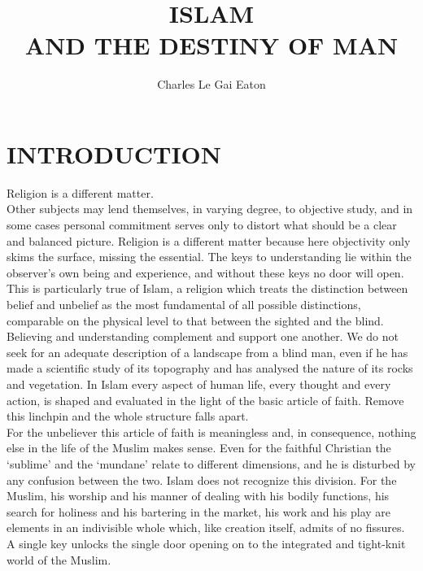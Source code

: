 \documentclass[10pt, twoside,openright]{book}
\title{\Huge \textbf{\textsc{ISLAM}\\ \Large AND THE DESTINY OF MAN}}
\author{\large Charles Le Gai Eaton}
\date{ }
\begin{document}


\maketitle
\tableofcontents

\frontmatter
{}

\pagestyle{fancy}
\fancyhf{}
\fancyhead[RO,LE]{\normalsize\thepage}
\renewcommand{\headrulewidth}{0pt}
\renewcommand{\footrulewidth}{0pt}
\renewcommand{\headsep}{3pt}

\renewcommand\footnoterule{\rule{0pt}{0pt}}
\setlength{\skip\footins}{5mm}


\chapter{INTRODUCTION}
Religion is a different matter.\\

Other subjects may lend themselves, in varying degree, to objective study, and in some cases personal commitment serves only to distort what should be a clear and balanced picture. Religion is a different matter because here objectivity only skims the surface, missing the essential. The keys to understanding lie within the observer's own being and experience, and without these keys no door will open. This is particularly true of Islam, a religion which treats the distinction between belief and unbelief as the most fundamental of all possible distinctions, comparable on the physical level to that between the sighted and the blind. Believing and understanding complement and support one another. We do not seek for an adequate description of a landscape from a blind man, even if he has made a scientific study of its topography and has analysed the nature of its rocks and vegetation. In Islam every aspect of human life, every thought and every action, is shaped and evaluated in the light of the basic article of faith. Remove this linchpin and the whole structure falls apart.\\

For the unbeliever this article of faith is meaningless and, in consequence, nothing else in the life of the Muslim makes sense. Even for the faithful Christian the `sublime' and the `mundane' relate to different dimensions, and he is disturbed by any confusion between the two. Islam does not recognize this division. For the Muslim, his worship and his manner of dealing with his bodily functions, his search for holiness and his bartering in the market, his work and his play are elements in an indivisible whole which, like creation itself, admits of no fissures. A single key unlocks the single door opening on to the integrated and tight\hyp{}knit world of the Muslim.\\
\end{document}
